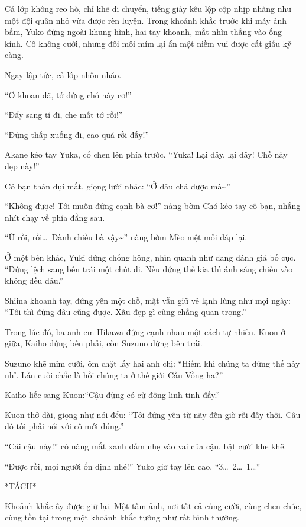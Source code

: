 \documentclass[../main.tex]{subfiles}
\begin{document}
Cả lớp không reo hò, chỉ khẽ di chuyển, tiếng giày kêu lộp cộp nhịp nhàng như một đội quân nhỏ vừa được rèn luyện. Trong khoảnh khắc trước khi máy ảnh bấm, Yuko đứng ngoài khung hình, hai tay khoanh, mắt nhìn thẳng vào ống kính. Cô không cười, nhưng đôi môi mím lại ẩn một niềm vui được cất giấu kỹ càng.

Ngay lập tức, cả lớp nhốn nháo.

``Ơ khoan đã, tớ đứng chỗ này cơ!''

``Đẩy sang tí đi, che mất tớ rồi!''

``Đứng thấp xuống đi, cao quá rồi đấy!''

Akane kéo tay Yuka, cố chen lên phía trước. ``Yuka! Lại đây, lại đây! Chỗ này đẹp này!''

Cô bạn thân dụi mắt, giọng lười nhác: ``Ở đâu chả được mà\~{}''

``Không được! Tôi muốn đứng cạnh bà cơ!'' nàng bờm Chó kéo tay cô bạn, nhắng nhít chạy về phía đằng sau.

``Ừ rồi, rồi\dots\ Đành chiều bà vậy\~{}'' nàng bờm Mèo mệt mỏi đáp lại.

Ở một bên khác, Yuki đứng chống hông, nhìn quanh như đang đánh giá bố cục.
``Đứng lệch sang bên trái một chút đi. Nếu đứng thế kia thì ánh sáng chiếu vào không đều đâu.''

Shiina khoanh tay, đứng yên một chỗ, mặt vẫn giữ vẻ lạnh lùng như mọi ngày: ``Tôi thì đứng đâu cũng được. Xấu đẹp gì cũng chẳng quan trọng.''

Trong lúc đó, ba anh em Hikawa đứng cạnh nhau một cách tự nhiên. Kuon ở giữa, Kaiho đứng bên phải, còn Suzuno đứng bên trái.

Suzuno khẽ mỉm cười, ôm chặt lấy hai anh chị: ``Hiếm khi chúng ta đứng thế này nhỉ. Lần cuối chắc là hồi chúng ta ở thế giới Cầu Vồng ha?''

Kaiho liếc sang Kuon:``Cậu đừng có cử động linh tinh đấy.''

Kuon thở dài, giọng như nói đểu: ``Tôi đứng yên từ nãy đến giờ rồi đấy thôi. Câu đó tôi phải nói với cô mới đúng.''

``Cái cậu này!'' cô nàng mắt xanh đấm nhẹ vào vai của cậu, bật cười khe khẽ.

``Được rồi, mọi người ổn định nhé!'' Yuko giơ tay lên cao. ``3\dots\ 2\dots\ 1\dots''

*TÁCH*

Khoảnh khắc ấy được giữ lại. Một tấm ảnh, nơi tất cả cùng cười, cùng chen chúc, cùng tồn tại trong một khoảnh khắc tưởng như rất bình thường.
\end{document}
